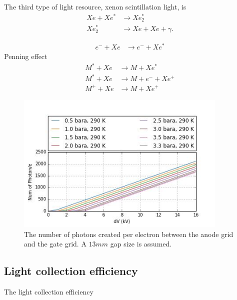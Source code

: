 The third type of light resource, xenon scintillation light, is 
\begin{align}
Xe + Xe^* &\rightarrow Xe_2^* \\
Xe_2^* &\rightarrow Xe + Xe + \gamma.
\end{align}

\begin{align}
e^- + Xe &\rightarrow e^- + Xe^*
\end{align}
Penning effect
\begin{align}
M^* + Xe &\rightarrow M + Xe^* \\
M^* + Xe &\rightarrow M + e^- + Xe^+  \\
M^+ + Xe &\rightarrow M + Xe^+
\end{align}



\begin{figure}[!ht]
  \centering
  \includegraphics[width=0.9\textwidth]
  {Figures/Ch10/PhotonCreation_Naive.jpg}
  \caption{The number of photons created per electron between the anode grid and the gate grid. A $13 mm$ gap size is assumed.}
  \label{fig: Photon Creation Naive}
\end{figure}


\subsection{Light collection efficiency}
The light collection efficiency

